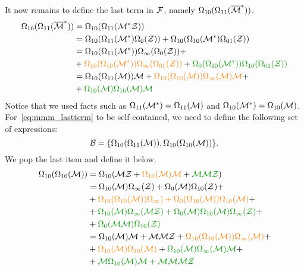 \documentclass[12pt, a4paper, twoside]{report}
\begin{document}
It now remains to define the last term in $\mathcal{F}$, namely $\Omega_{10}(\Omega_{11}(\overline{\mathcal{M}}^*))$. 
\begin{align}
  \begin{aligned}
\Omega_{10}(\Omega_{11}(\barMstar)) &= \Omega_{10}(\Omega_{11}(\Mstar\Z))\\
                                    &= \Omega_{10}(\Omega_{11}(\Mstar)\Omega_0(\Z)) + \Omega_{10}(\Omega_{10}(\Mstar)\Omega_{01}(\Z))\\
                                    &= \Omega_{10}(\Omega_{11}(\Mstar))\Omega_\infty(\Omega_0(\Z)) +\\
                                    &+ \textcolor{orange}{\Omega_{10}(\Omega_{10}(\Mstar))\Omega_\infty(\Omega_{01}(\Z))} + \textcolor{green}{\Omega_0(\Omega_{10}(\Mstar))\Omega_{10}(\Omega_{01}(\Z))}\\
                                    &= \Omega_{10}(\Omega_{11}(\M))\M + \textcolor{orange}{\Omega_{10}(\Omega_{10}(\M))\Omega_\infty(\M)\M} +\\
                                    &+ \textcolor{green}{\Omega_{10}(\M)\Omega_{10}(\M)\M} \\
  \end{aligned}
\label{eq:mmm_lastterm}
\end{align}
Notice that we used facts such as $\Omega_{11}(\mathcal{M}^*) = \Omega_{11}(\mathcal{M})$ and $\Omega_{10}(\mathcal{M}^*)=\Omega_{10}(\mathcal{M})$. For~\eqref{eq:mmm_lastterm} to be self-contained, we need to define the following set of expressions: $$\mathcal{B} = \{\Omega_{10}(\Omega_{11}(\mathcal{M})), \Omega_{10}(\Omega_{10}(\mathcal{M}))\}.$$
We pop the last item and define it below.
\begin{align}
  \begin{aligned}
    \Omega_{10}(\Omega_{10}(\M)) &= \Omega_{10}(\M\Z + \textcolor{orange}{\Omega_{10}(\M)\M} + \textcolor{green}{\M\M\Z})\\
    &= \Omega_{10}(\M)\Omega_\infty(\Z) + \Omega_0(\M)\Omega_{10}(\Z) +\\
    &+ \textcolor{orange}{\Omega_{10}(\Omega_{10}(\M))\Omega_\infty) + \Omega_0(\Omega_{10}(\M))\Omega_{10}(\M)} +\\
    &+ \textcolor{green}{\Omega_{10}(\M)\Omega_\infty(\M\Z) + \Omega_0(\M)\Omega_{10}(\M)\Omega_\infty(\Z)} +\\
    &+ \textcolor{green}{\Omega_0(\M\M)\Omega_{10}(\Z)}\\
    &= \Omega_{10}(\M)\M + \M\M\Z + \textcolor{orange}{\Omega_{10}(\Omega_{10}(\M))\Omega_\infty(\M)} +\\
    &+ \textcolor{orange}{\Omega_{10}(\M)\Omega_{10}(\M)} + \textcolor{green}{\Omega_{10}(\M)\Omega_\infty(\M)\M} +\\
    &+ \textcolor{green}{\M\Omega_{10}(\M)\M + \M\M\M\Z}
  \end{aligned}
      \label{eq:mmm_omega1010M}
\end{align}
\end{document}
